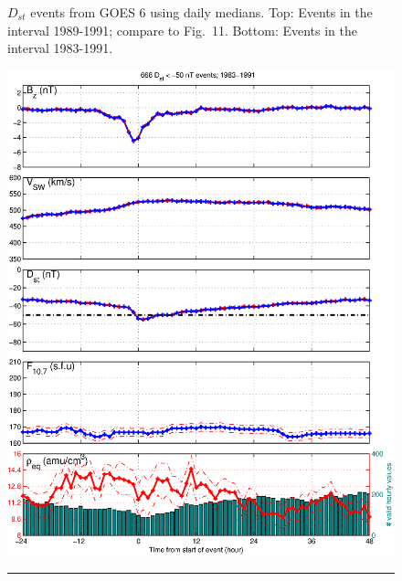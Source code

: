 \documentclass[10pt,twocolumn]{article}
\begin{document}
\begin{figure}[tp!]
\caption{$D_{st}$ events from GOES 6 using daily medians. Top: Events in the interval 1989-1991; compare to \cite{Takahashi2010} Fig.~11. Bottom: Events in the interval 1983-1991.}
\label{DailyAveragedDstEvents}
\end{figure}

\begin{figure}[tp!]
\centering
\includegraphics[scale=0.40]{figures/stormavs-dst.eps}
\rule[1ex]{5cm}{1pt}

\end{figure}
\end{document}
